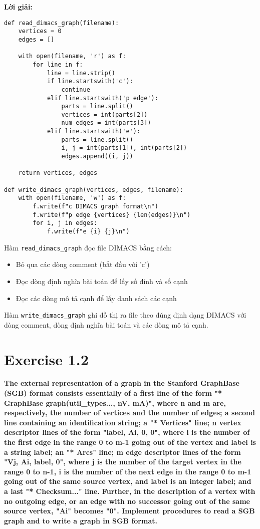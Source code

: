 \documentclass[12pt]{article}
\begin{document}
\textbf{Lời giải:}

\begin{lstlisting}
def read_dimacs_graph(filename):
    vertices = 0
    edges = []
    
    with open(filename, 'r') as f:
        for line in f:
            line = line.strip()
            if line.startswith('c'):
                continue
            elif line.startswith('p edge'):
                parts = line.split()
                vertices = int(parts[2])
                num_edges = int(parts[3])
            elif line.startswith('e'):
                parts = line.split()
                i, j = int(parts[1]), int(parts[2])
                edges.append((i, j))
    
    return vertices, edges

def write_dimacs_graph(vertices, edges, filename):
    with open(filename, 'w') as f:
        f.write(f"c DIMACS graph format\n")
        f.write(f"p edge {vertices} {len(edges)}\n")
        for i, j in edges:
            f.write(f"e {i} {j}\n")
\end{lstlisting}

Hàm \texttt{read\_dimacs\_graph} đọc file DIMACS bằng cách:
\begin{itemize}
    \item Bỏ qua các dòng comment (bắt đầu với 'c')
    \item Đọc dòng định nghĩa bài toán để lấy số đỉnh và số cạnh
    \item Đọc các dòng mô tả cạnh để lấy danh sách các cạnh
\end{itemize}

Hàm \texttt{write\_dimacs\_graph} ghi đồ thị ra file theo đúng định dạng DIMACS với dòng comment, dòng định nghĩa bài toán và các dòng mô tả cạnh.

\section{Exercise 1.2}
\textbf{The external representation of a graph in the Stanford GraphBase (SGB) format consists essentially of a first line of the form "* GraphBase graph(util\_types..., nV, mA)", where n and m are, respectively, the number of vertices and the number of edges; a second line containing an identification string; a "* Vertices" line; n vertex descriptor lines of the form "label, Ai, 0, 0", where i is the number of the first edge in the range 0 to m-1 going out of the vertex and label is a string label; an "* Arcs" line; m edge descriptor lines of the form "Vj, Ai, label, 0", where j is the number of the target vertex in the range 0 to n-1, i is the number of the next edge in the range 0 to m-1 going out of the same source vertex, and label is an integer label; and a last "* Checksum..." line. Further, in the description of a vertex with no outgoing edge, or an edge with no successor going out of the same source vertex, "Ai" becomes "0". Implement procedures to read a SGB graph and to write a graph in SGB format.}
\end{document}
